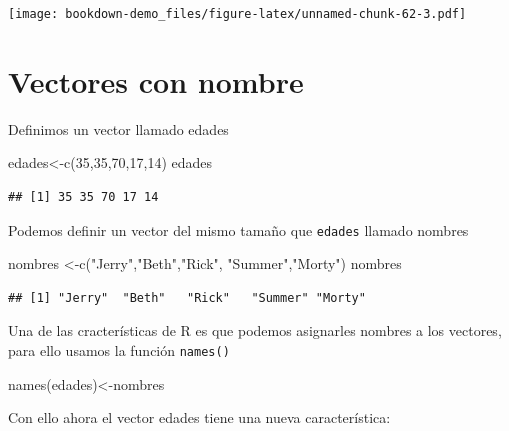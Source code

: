 \documentclass[
]{book}
\newenvironment{Shaded}{\begin{snugshade}}{\end{snugshade}}
\newcommand{\DecValTok}[1]{\textcolor[rgb]{0.00,0.00,0.81}{#1}}
\newcommand{\FunctionTok}[1]{\textcolor[rgb]{0.00,0.00,0.00}{#1}}
\newcommand{\NormalTok}[1]{#1}
\newcommand{\OtherTok}[1]{\textcolor[rgb]{0.56,0.35,0.01}{#1}}
\newcommand{\StringTok}[1]{\textcolor[rgb]{0.31,0.60,0.02}{#1}}
\begin{document}
\texttt{[image: bookdown-demo\_files/figure-latex/unnamed-chunk-62-3.pdf]}

\hypertarget{vectores-con-nombre}{%
\section{Vectores con nombre}\label{vectores-con-nombre}}

Definimos un vector llamado edades

\begin{Shaded}
\begin{Highlighting}[]
\NormalTok{edades}\OtherTok{\textless{}{-}}\FunctionTok{c}\NormalTok{(}\DecValTok{35}\NormalTok{,}\DecValTok{35}\NormalTok{,}\DecValTok{70}\NormalTok{,}\DecValTok{17}\NormalTok{,}\DecValTok{14}\NormalTok{)}
\NormalTok{edades}
\end{Highlighting}
\end{Shaded}

\begin{verbatim}
## [1] 35 35 70 17 14
\end{verbatim}

Podemos definir un vector del mismo tamaño que \texttt{edades} llamado nombres

\begin{Shaded}
\begin{Highlighting}[]
\NormalTok{nombres }\OtherTok{\textless{}{-}}\FunctionTok{c}\NormalTok{(}\StringTok{"Jerry"}\NormalTok{,}\StringTok{"Beth"}\NormalTok{,}\StringTok{"Rick"}\NormalTok{, }\StringTok{"Summer"}\NormalTok{,}\StringTok{"Morty"}\NormalTok{)}
\NormalTok{nombres}
\end{Highlighting}
\end{Shaded}

\begin{verbatim}
## [1] "Jerry"  "Beth"   "Rick"   "Summer" "Morty"
\end{verbatim}

Una de las cracterísticas de R es que podemos asignarles nombres a los vectores, para ello usamos la función \texttt{names()}

\begin{Shaded}
\begin{Highlighting}[]
\FunctionTok{names}\NormalTok{(edades)}\OtherTok{\textless{}{-}}\NormalTok{nombres}
\end{Highlighting}
\end{Shaded}

Con ello ahora el vector edades tiene una nueva característica:
\end{document}

